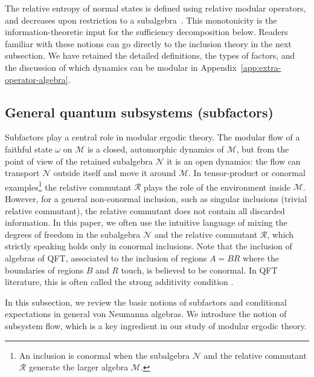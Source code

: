 \documentclass[a4paper,11pt]{article}
\theoremstyle{definition}
\newcommand{\mR}{\mathcal{R}}
\newcommand{\mN}{\mathcal{N}}
\newcommand{\mM}{\mathcal{M}}
\begin{document}
The relative entropy of normal states is defined using relative modular operators, and decreases upon restriction to a subalgebra~\cite{Araki1976,Araki1977}. This monotonicity is the information-theoretic input for the sufficiency decomposition below. Readers familiar with these notions can go directly to the inclusion theory in the next subsection. We have retained the detailed definitions, the types of factors, and the discussion of which dynamics can be modular in Appendix~\ref{app:extra-operator-algebra}.

\subsection{General quantum subsystems (subfactors)}
\label{subsec:quantum-coarse}

Subfactors play a central role in modular ergodic theory. The modular flow of a faithful state $\omega$ on $\mM$ is a closed, automorphic dynamics of $\mM$, but from the point of view of the retained subalgebra $\mN$ it is an open dynamics: the flow can transport $\mN$ outside itself and move it around $\mM$. In tensor-product or conormal examples\footnote{An inclusion is conormal when the subalgebra $\mN$ and the relative commutant $\mR$ generate the larger algebra $\mM$.} the relative commutant $\mR$ plays the role of the environment inside $\mM$. However, for a general non-conormal inclusion, such as singular inclusions (trivial relative commutant), the relative commutant does not contain all discarded information. In this paper, we often use the intuitive language of mixing the degrees of freedom in the subalgebra $\mN$ and the relative commutant $\mR$, which strictly speaking holds only in conormal inclusions. Note that the inclusion of algebras of QFT, associated to the inclusion of regions $A=BR$ where the boundaries of regions $B$ and $R$ touch, is believed to be conormal. In QFT literature, this is often called the strong additivity condition \cite{Wiesbrock1993b,Guido1998}.

In this subsection, we review the basic notions of subfactors and conditional expectations in general von Neumanna algebras. We introduce the notion of subsystem flow, which is a key ingredient in our study of modular ergodic theory.
\end{document}
